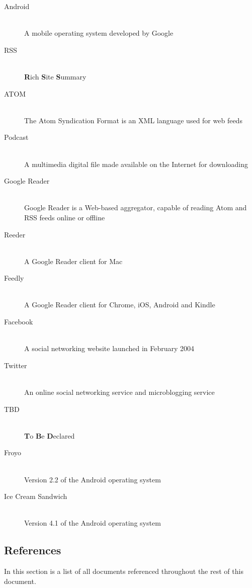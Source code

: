 \begin{description}
  \item[Android] \hfill \\
  A mobile operating system developed by Google
  \item[RSS] \hfill \\
  \textbf{R}ich \textbf{S}ite \textbf{S}ummary
  \item[ATOM] \hfill \\
  The Atom Syndication Format is an XML language used for web feeds
  \item[Podcast] \hfill \\
  A multimedia digital file made available on the Internet for downloading
  \item[Google Reader] \hfill \\
  Google Reader is a Web-based aggregator, capable of reading Atom and RSS feeds online or offline
  \item[Reeder] \hfill \\
  A Google Reader client for Mac
  \item[Feedly] \hfill \\
  A Google Reader client for Chrome, iOS, Android and Kindle
  \item[Facebook] \hfill \\
  A social networking website launched in February 2004
  \item[Twitter] \hfill \\
  An online social networking service and microblogging service
  \item[TBD] \hfill \\
  \textbf{T}o \textbf{B}e \textbf{D}eclared
  \item[Froyo] \hfill \\
  Version 2.2 of the Android operating system
  \item[Ice Cream Sandwich] \hfill \\
  Version 4.1 of the Android operating system
\end{description}


\subsection{References}
In this section is a list of all documents referenced throughout the rest of this document.


